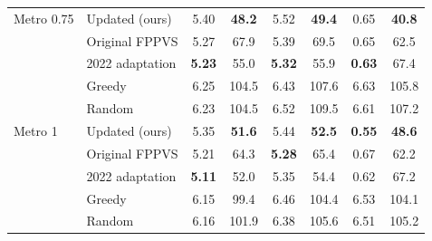\begin{tabular}{llcccccc}
\midrule
Metro 0.75 & Updated (ours) & 5.40 & \textbf{48.2} & 5.52 & \textbf{49.4} & 0.65 & \textbf{40.8} \\
 & Original FPPVS & 5.27 & 67.9 & 5.39 & 69.5 & 0.65 & 62.5 \\
 & 2022 adaptation & \textbf{5.23} & 55.0 & \textbf{5.32} & 55.9 & \textbf{0.63} & 67.4 \\
 & Greedy & 6.25 & 104.5 & 6.43 & 107.6 & 6.63 & 105.8 \\
 & Random & 6.23 & 104.5 & 6.52 & 109.5 & 6.61 & 107.2 \\
\midrule
Metro 1 & Updated (ours) & 5.35 & \textbf{51.6} & 5.44 & \textbf{52.5} & \textbf{0.55} & \textbf{48.6} \\
 & Original FPPVS & 5.21 & 64.3 & \textbf{5.28} & 65.4 & 0.67 & 62.2 \\
 & 2022 adaptation & \textbf{5.11} & 52.0 & 5.35 & 54.4 & 0.62 & 67.2 \\
 & Greedy & 6.15 & 99.4 & 6.46 & 104.4 & 6.53 & 104.1 \\
 & Random & 6.16 & 101.9 & 6.38 & 105.6 & 6.51 & 105.2 \\
\bottomrule
\end{tabular}